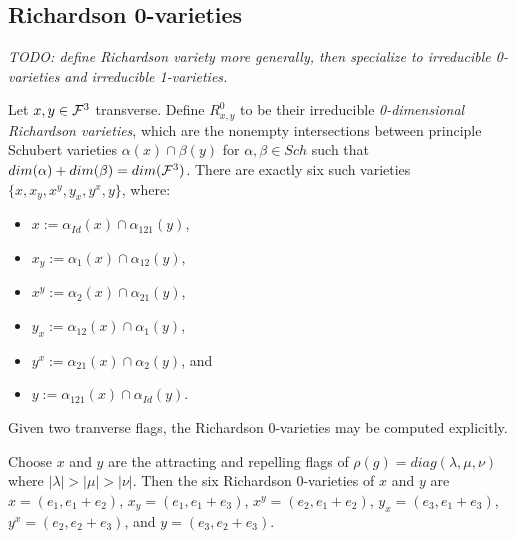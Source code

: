 \subsection{Richardson 0-varieties}
\emph{TODO: define Richardson variety more generally, then specialize to irreducible 0-varieties and irreducible 1-varieties.}

Let $x,y \in \mathcal{F}^3$ transverse. 
Define $R^0_{x,y}$ to be their irreducible \emph{0-dimensional Richardson varieties}, 
which are the nonempty intersections between principle Schubert varieties 
$\alpha(x) \cap \beta(y)$ for $\alpha,\beta \in Sch$ such that $dim(\alpha) + dim(\beta) = dim(\mathcal{F}^3)$.
There are exactly six such varieties $\{x, x_y, x^y, y_x, y^x, y\}$, where:
    \begin{itemize}
        \item $x := \alpha_{Id}(x) \cap \alpha_{121}(y)$,
        \item $x_y := \alpha_1(x) \cap \alpha_{12}(y)$,
        \item $x^y := \alpha_2(x) \cap \alpha_{21}(y)$,
        \item $y_x := \alpha_{12}(x) \cap \alpha_1(y)$,
        \item $y^x := \alpha_{21}(x) \cap \alpha_2(y)$, and
        \item $y := \alpha_{121}(x) \cap \alpha_{Id}(y)$.
    \end{itemize}
Given two tranverse flags, the Richardson 0-varieties may be computed explicitly.
\begin{example}\label{eg:r0}
    Choose $x$ and $y$ are the attracting and repelling flags of 
    $\rho(g) = diag(\lambda, \mu, \nu)$ where $|\lambda| > |\mu| > |\nu|$.
    Then the six Richardson 0-varieties of $x$ and $y$ are
    $x = (e_1, e_1 + e_2)$, 
    $x_y = (e_1, e_1+e_3)$, 
    $x^y = (e_2, e_1+e_2)$, 
    $y_x = (e_3, e_1+e_3)$,
    $y^x = (e_2, e_2+e_3)$, and
    $y = (e_3, e_2 + e_3)$.  
\end{example}

